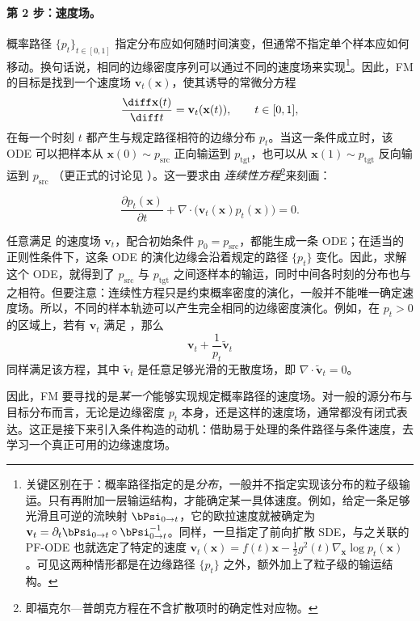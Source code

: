 \paragraph{第 2 步：速度场。}
概率路径 $\{p_t\}_{t\in[0,1]}$ 指定分布应如何随时间演变，但通常不指定单个样本应如何移动。换句话说，相同的边缘密度序列可以通过不同的速度场来实现\footnote{
关键区别在于：概率路径指定的是\emph{分布}，一般并不指定实现该分布的粒子级输运。只有再附加一层输运结构，才能确定某一具体速度。例如，给定一条足够光滑且可逆的流映射 $\bPsi_{0\to t}$，它的欧拉速度就被确定为
$\mathbf{v}_t=\partial_t\bPsi_{0\to t}\circ\bPsi_{0\to t}^{-1}$。同样，一旦指定了前向扩散 SDE，与之关联的 PF-ODE 也就选定了特定的速度
$\mathbf{v}_t(\mathbf{x})
=
f(t)\mathbf{x}
-\tfrac12g^2(t)\nabla_{\mathbf{x}}\log p_t(\mathbf{x})$。可见这两种情形都是在边缘路径 $\{p_t\}$ 之外，额外加上了粒子级的输运结构。
}。因此，FM 的目标是找到一个速度场 $\mathbf{v}_t(\mathbf{x})$，使其诱导的常微分方程
\[
\frac{\diff \mathbf{x}(t)}{\diff t}
=
\mathbf{v}_t(\mathbf{x}(t)),
\qquad
t\in[0,1],
\]
在每一个时刻 $t$ 都产生与规定路径相符的边缘分布 $p_t$。当这一条件成立时，该 ODE 可以把样本从
$\mathbf{x}(0)\sim p_{\text{src}}$ 正向输运到 $p_{\text{tgt}}$，也可以从
$\mathbf{x}(1)\sim p_{\text{tgt}}$ 反向输运到 $p_{\text{src}}$
（更正式的讨论见 ）。这一要求由 \emph{连续性方程}\footnote{
即福克尔—普朗克方程在不含扩散项时的确定性对应物。}来刻画：
\begin{mdframed}
\begin{equation}\label{eq:continuity_eq}
    \frac{\partial p_t(\mathbf{x})}{\partial t}
    +
    \nabla\cdot
    \bigl(
    \mathbf{v}_t(\mathbf{x})p_t(\mathbf{x})
    \bigr)
    =
    0.
\end{equation}
\end{mdframed}

任意满足  的速度场 $\mathbf{v}_t$，配合初始条件 $p_0=p_{\mathrm{src}}$，都能生成一条 ODE；在适当的正则性条件下，这条 ODE 的演化边缘会沿着规定的路径 $\{p_t\}$ 变化。因此，求解这个 ODE，就得到了 $p_{\mathrm{src}}$ 与 $p_{\mathrm{tgt}}$ 之间逐样本的输运，同时中间各时刻的分布也与之相符。但要注意：连续性方程只是约束概率密度的演化，一般并不能唯一确定速度场。所以，不同的样本轨迹可以产生完全相同的边缘密度演化。例如，在 $p_t>0$ 的区域上，若有
$\mathbf{v}_t$ 满足 ，那么
\[
\mathbf{v}_t
+
\frac{1}{p_t}\tilde{\mathbf{v}}_t
\]
同样满足该方程，其中 $\tilde{\mathbf{v}}_t$ 是任意足够光滑的无散度场，即
$\nabla\cdot\tilde{\mathbf{v}}_t=0$。

因此，FM 要寻找的是\emph{某一个}能够实现规定概率路径的速度场。对一般的源分布与目标分布而言，无论是边缘密度 $p_t$ 本身，还是这样的速度场，通常都没有闭式表达。这正是接下来引入条件构造的动机：借助易于处理的条件路径与条件速度，去学习一个真正可用的边缘速度场。

